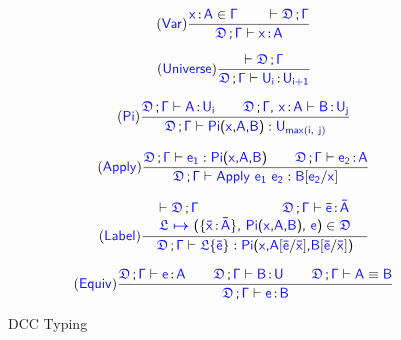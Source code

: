 \begin{figure}
\renewcommand{\arraystretch}{1.3}
	\begin{equation}
		\tag{\targettext{Var}}
		\frac
			{\itemtype{x}{A} \in \target{\Gamma} \qquad
			 \vdash \target{\fdef}\semicolon \target{\Gamma} }
			{\target{\fdef}\semicolon \target{\Gamma} \vdash \itemtype{x}{A}}
	\end{equation}

	\begin{equation}
		\tag{\targettext{Universe}}
		\frac
			{\vdash \target{\fdef}\semicolon \target{\Gamma} }
			{\target{\fdef}\semicolon \target{\Gamma} \vdash \itemtype{U_i}{U_{i+1}}}
	\end{equation}

	\begin{equation}
		\tag{\targettext{Pi}}
		\frac
			{\target{\fdef}\semicolon \target{\Gamma} \vdash \itemtype{A}{U_i} \qquad
			 \target{\fdef}\semicolon \target{\Gamma}\sfcomma \itemtype{x}{A} \vdash \itemtype{B}{U_j}
			}
			{\target{\fdef}\semicolon \target{\Gamma} \vdash \targetpi{x}{A}{B} \mathrel{:} \target{U}_{\target{max}(\target{i},\ \target{j})} }
	\end{equation}

	\begin{equation}
		\tag{\targettext{Apply}}
		\frac
			{\target{\fdef}\semicolon \target{\Gamma} \vdash \target{e_1} \mathrel{:} \targetpi{x}{A}{B} \qquad
			 \target{\fdef}\semicolon \target{\Gamma} \vdash \itemtype{e_2}{A} }
			{\target{\fdef}\semicolon \target{\Gamma} \vdash \targetapp{e_1}{e_2} \mathrel{:} \target{B} \targetsub{e_2}{x}}
	\end{equation}

	\begin{equation}
		\tag{\targettext{Label}}
		\frac
			{\begin{array}{l}
			  	\vdash \target{\fdef}\semicolon \target{\Gamma} \qquad\qquad\qquad \target{\fdef}\semicolon \target{\Gamma} \vdash \itemtype{\bar{e}}{\bar{A}} \\
			  	\itemdef{\target{\flabel}}{\itemtype{\bar{x}}{\bar{A}}}{\targetpi{x}{A}{B}}{\target{e}} \in \target{\fdef} \\
			 \end{array}	 
			}
			{\quad \target{\fdef}\semicolon \target{\Gamma} \vdash \targetlab{\flabel}{\bar{e}} \mathrel{:} 
			 \target{Pi}\textsf{(}\target{x}\textsf{,} \target{A} \targetsub{\bar{e}}{\bar{x}}\textsf{,} \target{B} \targetsub{\bar{e}}{\bar{x}}\textsf{)} \quad
			}
	\end{equation}

	\begin{equation}
		\tag{\targettext{Equiv}}
		\frac
			{\target{\fdef}\semicolon \target{\Gamma} \vdash \itemtype{e}{A} \qquad
			 \target{\fdef}\semicolon \target{\Gamma} \vdash \itemtype{B}{U} \qquad
			 \target{\fdef}\semicolon \target{\Gamma} \vdash \target{A} \equiv \target{B}
			}
			{\target{\fdef}\semicolon \target{\Gamma} \vdash \itemtype{e}{B}}
	\end{equation}
	\caption{DCC Typing}
    \label{fig:dcc typing}
\end{figure}

